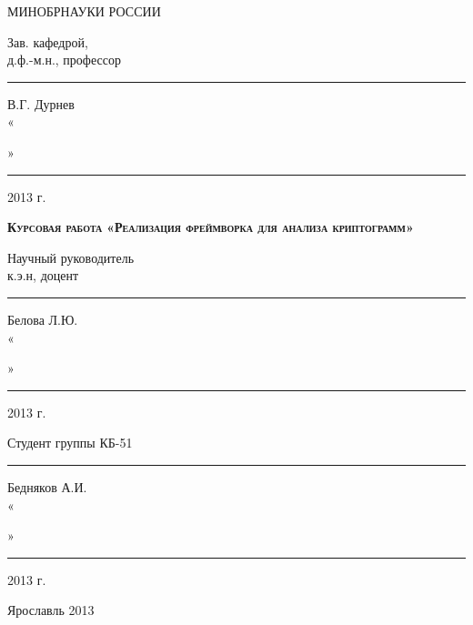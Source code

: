 \begin{titlepage}
    \begin{center}
        МИНОБРНАУКИ РОССИИ
        \linebreak

        \vspace{48pt}{
        Федеральное государственное бюджетное образовательное 
        учреждение высшего профессионального образования
        \linebreak
        «Ярославский государственный университет им. П.Г. Демидова»
        }
        \linebreak

        \vspace{1em}{
        Кафедра компьютерной безопасности и
        математических методов обработки информации
        }
    \end{center}

    \vspace{1em}

    \begin{flushright}
        Зав. кафедрой,  \\
        д.ф.-м.н., профессор  \\
        \rule{2,2cm}{1pt} В.Г. Дурнев \\
        «\rule{0,5cm}{1pt}» \rule{2,5cm}{1pt} 2013 г.
    \end{flushright}

    \begin{center}
        \textsc{\textbf{Курсовая работа}}
        \linebreak
        \textsc{\textbf{«Реализация фреймворка для анализа криптограмм»}}
    \end{center}

    \vspace{6em}

	\begin{flushright}
        Научный руководитель \\
        к.э.н, доцент  \\
        \rule{2,2cm}{1pt} Белова Л.Ю. \\
        «\rule{0,5cm}{1pt}» \rule{2,5cm}{1pt} 2013 г.

        \vspace{1.5em}

        Студент группы КБ-51 \\
        \rule{2cm}{1pt} Бедняков А.И. \\
        «\rule{0,5cm}{1pt}» \rule{2,5cm}{1pt} 2013 г.
	\end{flushright}

    \vspace{\fill}

    \begin{center}
        Ярославль 2013
    \end{center}
\end{titlepage}
